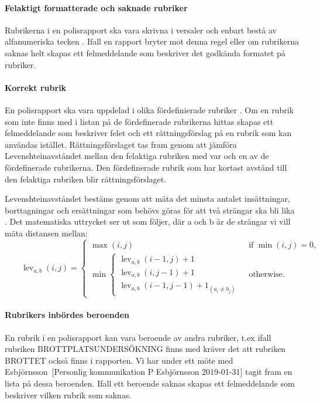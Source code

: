 \documentclass[swedish]{maucsthesis}
\begin{document}
\paragraph*{Felaktigt formatterade och saknade rubriker}

Rubrikerna i en polisrapport ska vara skrivna i versaler och enbart bestå av 
alfanumeriska tecken \cite{durtva:2017}. Ifall en rapport bryter mot denna regel 
eller om rubrikerna saknas helt skapas ett felmeddelande som beskriver det godkända
formatet på rubriker.

\paragraph*{Korrekt rubrik}

En polisrapport ska vara uppdelad i olika fördefinierade rubriker
\cite{durtva:2017}. Om en rubrik som inte finns med i listan på de
fördefinerade \cite{per:2018} rubrikerna hittas skapas ett felmeddelande som beskriver felet och
ett rättningsförslag på en rubrik som kan användas istället. Rättningsförslaget
tas fram genom att jämföra Levenshteinavståndet mellan den felaktiga rubriken
med var och en av de fördefinerade rubrikerna. Den fördefinerade rubrik som har
kortast avstånd till den felaktiga rubriken blir rättningsförslaget.

Levenshteinavståndet bestäms genom att mäta det minsta antalet insättningar, borttagningar och ersättningar
som behövs göras för att två strängar ska bli lika \cite{navarro:2001}.
Det matematiska uttrycket ser ut som följer, där a och b är de strängar vi vill mäta distansen mellan:
\[\qquad\operatorname{lev}_{a,b}(i,j) = \begin{cases}
  \max(i,j) & \text{ if } \min(i,j)=0, \\
  \min \begin{cases}
          \operatorname{lev}_{a,b}(i-1,j) + 1 \\
          \operatorname{lev}_{a,b}(i,j-1) + 1 \\
          \operatorname{lev}_{a,b}(i-1,j-1) + 1_{(a_i \neq b_j)}
       \end{cases} & \text{ otherwise.}
\end{cases}\]

\paragraph*{Rubrikers inbördes beroenden}

En rubrik i en polisrapport kan vara beroende av andra rubriker, t.ex ifall
rubriken BROTTPLATSUNDERSÖKNING finns med kräver det att rubriken BROTTET också
finns i rapporten. Vi har under ett möte med Esbjörnsson~[Personlig kommunikation P Esbjörnsson 2019-01-31]
tagit fram en lista på dessa beroenden. Ifall ett beroende saknas skapas ett felmeddelande
som beskriver vilken rubrik som saknas.
\end{document}

